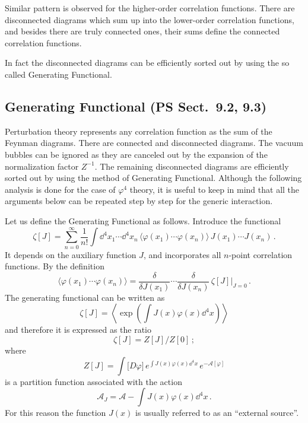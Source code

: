 Similar pattern is observed for the higher-order correlation functions. There
are disconnected diagrams which sum up into the lower-order correlation
functions, and besides there are truly connected ones, their sums define the
connected correlation functions.

In fact the disconnected diagrams can be efficiently sorted out by using the so
called Generating Functional.

\subsection*{Generating Functional (PS Sect.~9.2, 9.3)}

Perturbation theory represents any correlation function as the sum of the
Feynman diagrams. There are connected and disconnected diagrams. The vacuum
bubbles can be ignored as they are canceled out by the expansion of the
normalization factor $Z^{-1}$. The remaining disconnected diagrams are
efficiently sorted out by using the method of Generating Functional. Although
the following analysis is done for the case of $\varphi^4$ theory, it is useful
to keep in mind that all the arguments below can be repeated step by step for
the generic interaction.

Let us define the Generating Functional as follows. Introduce the functional
\begin{equation}\label{eq:zetaJ}
\zeta[J]=\sum_{n=0}^\infty\frac1{n!}\int \dd^4x_1\cdots \dd^4x_n\,\bigl\langle\varphi(x_1)\cdots\varphi(x_n)\bigr\rangle\,J(x_1)\cdots J(x_n)\,.
\end{equation}
It depends on the auxiliary function $J$, and incorporates all $n$-point
correlation functions. By the definition
\begin{equation}\label{eq:zetader}
\bigl\langle\varphi(x_1)\cdots\varphi(x_n)\bigr\rangle=\frac{\delta}{\delta J(x_1)}\cdots\frac{\delta}{\delta J(x_n)}\,\zeta[J]\Big|_{J=0}\,.
\end{equation}
The generating functional can be written as
\[
\zeta[J]=\left\langle\exp\left(\int J(x)\varphi(x)\dd^4x\right)\right\rangle
\]
and therefore it is expressed as the ratio
\[
\zeta[J]=Z[J]/Z[0]\,;
\]
where
\begin{equation}\label{eq:ZJ}
Z[J]=\int\bigl[D\varphi\bigr]\,e^{\int J(x)\varphi(x)\dd^4x}\,e^{-\mathcal A[\varphi]}
\end{equation}
is a partition function associated with the action
\[
\mathcal A_J=\mathcal A-\int J(x)\varphi(x)\dd^4x\,.
\]
For this reason the function $J(x)$ is usually referred to as an ``external
source''.

